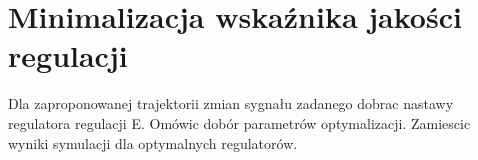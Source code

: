 \section{Minimalizacja wskaźnika jakości regulacji}
Dla zaproponowanej trajektorii zmian sygnału zadanego dobrac nastawy regulatora
regulacji E. Omówic dobór parametrów optymalizacji. Zamiescic wyniki symulacji dla
optymalnych regulatorów.
